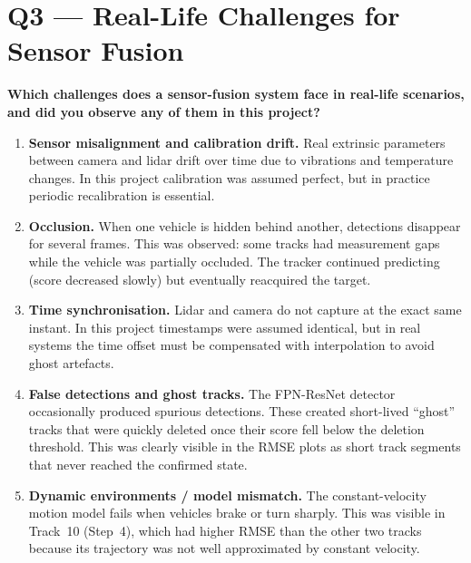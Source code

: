 \documentclass[12pt, a4paper]{article}
\begin{document}
\newpage

\section*{Q3 --- Real-Life Challenges for Sensor Fusion}

\textbf{Which challenges does a sensor-fusion system face in real-life scenarios,
and did you observe any of them in this project?}

\medskip

\begin{enumerate}[leftmargin=1.8em, itemsep=6pt]

  \item \textbf{Sensor misalignment and calibration drift.}
  Real extrinsic parameters between camera and lidar drift over time due to
  vibrations and temperature changes.
  In this project calibration was assumed perfect, but in practice periodic
  recalibration is essential.

  \item \textbf{Occlusion.}
  When one vehicle is hidden behind another, detections disappear for several frames.
  This was observed: some tracks had measurement gaps while the vehicle was partially
  occluded. The tracker continued predicting (score decreased slowly) but eventually
  reacquired the target.

  \item \textbf{Time synchronisation.}
  Lidar and camera do not capture at the exact same instant.
  In this project timestamps were assumed identical, but in real systems the
  time offset must be compensated with interpolation to avoid ghost artefacts.

  \item \textbf{False detections and ghost tracks.}
  The FPN-ResNet detector occasionally produced spurious detections.
  These created short-lived ``ghost'' tracks that were quickly deleted once
  their score fell below the deletion threshold.
  This was clearly visible in the RMSE plots as short track segments that
  never reached the confirmed state.

  \item \textbf{Dynamic environments / model mismatch.}
  The constant-velocity motion model fails when vehicles brake or turn sharply.
  This was visible in Track~10 (Step~4), which had higher RMSE than the other
  two tracks because its trajectory was not well approximated by constant velocity.

\end{enumerate}
\end{document}

